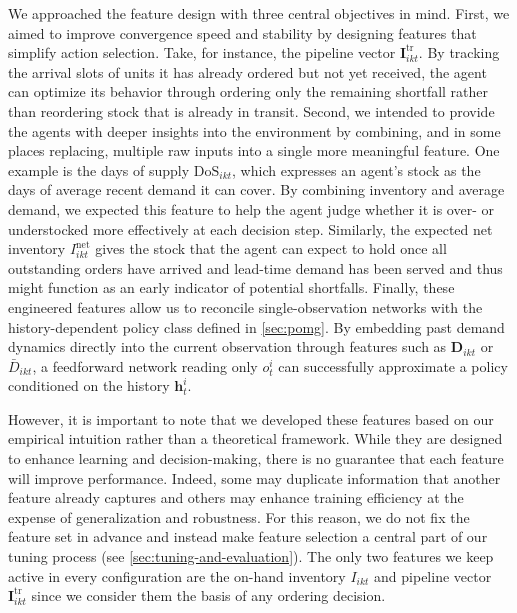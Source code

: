 We approached the feature design with three central objectives in mind. First, we aimed to improve convergence speed and stability by designing features that simplify action selection. Take, for instance, the pipeline vector $\mathbf{I}^{\mathrm{tr}}_{ikt}$. By tracking the arrival slots of units it has already ordered but not yet received, the agent can optimize its behavior through ordering only the remaining shortfall rather than reordering stock that is already in transit. Second, we intended to provide the agents with deeper insights into the environment by combining, and in some places replacing, multiple raw inputs into a single more meaningful feature. One example is the days of supply $\mathrm{DoS}_{ikt}$, which expresses an agent's stock as the days of average recent demand it can cover. By combining inventory and average demand, we expected this feature to help the agent judge whether it is over- or understocked more effectively at each decision step. Similarly, the expected net inventory $I_{ikt}^{\mathrm{net}}$ gives the stock that the agent can expect to hold once all outstanding orders have arrived and lead-time demand has been served and thus might function as an early indicator of potential shortfalls. Finally, these engineered features allow us to reconcile single-observation networks with the history-dependent policy class defined in \autoref{sec:pomg}. By embedding past demand dynamics directly into the current observation through features such as $\mathbf{D}_{ikt}$ or $\bar{D}_{ikt}$, a feedforward network reading only $o^i_t$ can successfully approximate a policy conditioned on the history $\mathbf{h}_t^i$.

However, it is important to note that we developed these features based on our empirical intuition rather than a theoretical framework. While they are designed to enhance learning and decision-making, there is no guarantee that each feature will improve performance. Indeed, some may duplicate information that another feature
already captures and others may enhance training efficiency at the expense of generalization and robustness. For this reason, we do not fix the feature set in advance and instead make feature selection a central part of our tuning process (see \autoref{sec:tuning-and-evaluation}). The only two features we keep active in every configuration are the on-hand inventory $I_{ikt}$ and pipeline vector $\mathbf{I}^{\mathrm{tr}}_{ikt}$ since we consider them the basis of any ordering decision.

